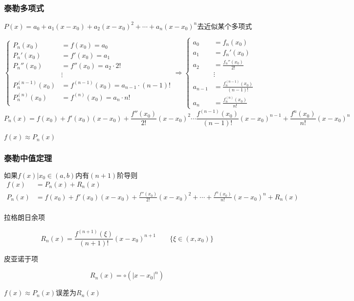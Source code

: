 \subsubsection{泰勒多项式}
\centerline{$P(x)=a_0+a_1(x-x_0)+a_2(x-x_0)^2+\cdots+a_n(x-x_0)^n\mbox{去近似某个多项式}$}
$\begin{cases}
    P_n(x_0)&=f(x_0)=a_0\\
    P_n'(x_0)&=f'(x_0)=a_1\\
    P_n''(x_0)&=f''(x_0)=a_2\cdot 2!\\
    &\vdots \\
    P_n^{(n-1)}(x_0)&=f^{(n-1)}(x_0)=a_{n-1}\cdot(n-1)!\\
    P_n^{(n)}(x_0)&=f^{(n)}(x_0)=a_n\cdot n!\\
\end{cases}\Rightarrow\begin{cases}
    a_0&= f_n(x_0)\\
    a_1&=f_n'(x_0)\\
    a_2&=\frac{f_n''(x_0)}{2!}\\
    &\vdots \\
    a_{n-1}&=\frac{f_n^{(n-1)}(x_0)}{(n-1)!}\\
    a_n&=\frac{f_n^{(n)}(x_0)}{n!}
\end{cases}$
$$P_n(x)=f(x_0)+f'(x_0)(x-x_0)+\frac{f''(x_0)}{2!}(x-x_0)^2\cdots\frac{f^{(n-1)}(x_0)}{(n-1)!}(x-x_0)^{n-1}+\frac{f^n(x_0)}{n!}(x-x_0)^n$$
\centerline{$f(x)\approx P_n(x)$}
\subsubsection{泰勒中值定理}
$\mbox{如果}{f(x)|x_0\in (a,b)}\mbox{内有}(n+1)\mbox{阶导则}$
\begin{displaymath}
    \begin{split}
        f(x)&=P_n(x)+R_n(x) \\
        P_n(x)&=f(x_0)+f'(x_0)(x-x_0)+\frac{f''(x_0)}{2!}(x-x_0)^2+\cdots+\frac{f^n(x_0)}{n!}(x-x_0)^n+R_n(x)\\
    \end{split}
\end{displaymath}
\centerline{拉格朗日余项}
\begin{equation}
    R_n(x)=\frac{f^{(n+1)}(\xi)}{(n+1)!}(x-x_0)^{n+1}\qquad \{\xi\in(x,x_0)\} \label{lagrange_remainder}
\end{equation}
\centerline{皮亚诺于项}
\begin{equation}
    R_n(x)=\circ(\left|x-x_0\right|^n) \label{Piano_remainder}
\end{equation}
\centerline{$f(x)\approx P_n(x)$误差为$R_n(x)$}
